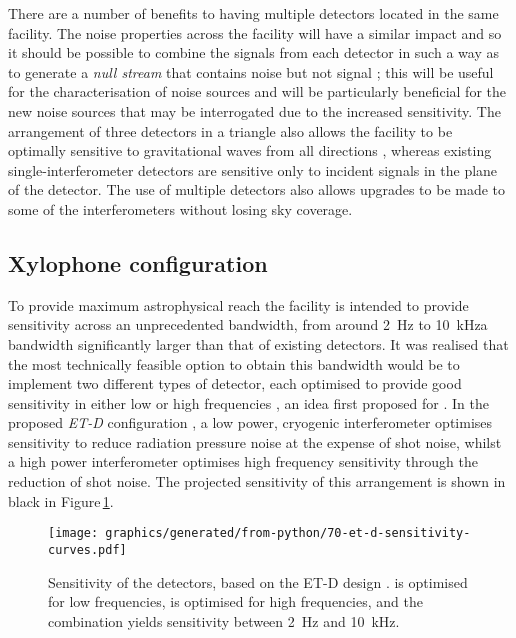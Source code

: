 There are a number of benefits to having multiple detectors located in the same facility. The noise properties across the facility will have a similar impact and so it should be possible to combine the signals from each detector in such a way as to generate a \emph{null stream} that contains noise but not signal \cite{Hewitson2005, Ajith2006}; this will be useful for the characterisation of noise sources and will be particularly beneficial for the new noise sources that may be interrogated due to the increased sensitivity. The arrangement of three detectors in a triangle also allows the facility to be optimally sensitive to gravitational waves from all directions \cite{Winkler1985}, whereas existing single-interferometer detectors are sensitive only to incident signals in the plane of the detector. The use of multiple detectors also allows upgrades to be made to some of the interferometers without losing sky coverage.

\subsection{Xylophone configuration}
To provide maximum astrophysical reach the facility is intended to provide sensitivity across an unprecedented bandwidth, from around \SI{2}{\hertz} to \SI{10}{\kilo\hertz}\textemdash a bandwidth significantly larger than that of existing detectors. It was realised that the most technically feasible option to obtain this bandwidth would be to implement two different types of detector, each optimised to provide good sensitivity in either low or high frequencies \cite{Hild2010}, an idea first proposed for \ALIGO{} \cite{Conforto2004}. In the proposed \emph{ET-D} configuration \cite{Hild2011}, a low power, cryogenic interferometer optimises sensitivity to reduce radiation pressure noise at the expense of shot noise, whilst a high power interferometer optimises high frequency sensitivity through the reduction of shot noise. The projected sensitivity of this arrangement is shown in black in Figure\,\ref{fig:et-d-sensitivity}.

\begin{figure}
  \centering
  \texttt{[image: graphics/generated/from-python/70-et-d-sensitivity-curves.pdf]}
  \caption[Sensitivity curves for the Einstein Telescope]{\label{fig:et-d-sensitivity}Sensitivity of the \ET{} detectors, based on the ET-D design \cite{Hild2011}. \ETLF{} is optimised for low frequencies, \ETHF{} is optimised for high frequencies, and the combination yields sensitivity between \SI{2}{\hertz} and \SI{10}{\kilo\hertz}.}
\end{figure}


